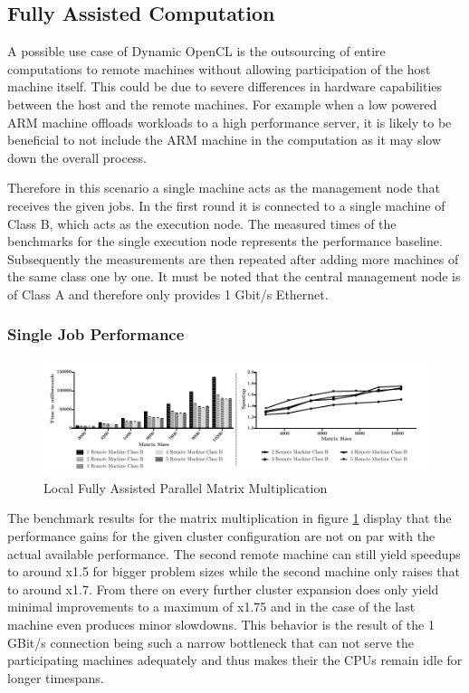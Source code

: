 \subsection{Fully Assisted Computation}
A possible use case of Dynamic OpenCL is the outsourcing of entire computations to remote machines without allowing participation of the host machine itself. This could be due to severe differences in hardware capabilities between the host and the remote machines. For example when a low powered ARM machine offloads workloads to a high performance server, it is likely to be beneficial to not include the ARM machine in the computation as it may slow down the overall process.

Therefore in this scenario a single machine acts as the management node that receives the given jobs. In the first round it is connected to a single machine of Class B, which acts as the execution node. The measured times of the benchmarks for the single execution node represents the performance baseline. Subsequently the measurements are then repeated after adding more machines of the same class one by one. It must be noted that the central management node is of Class A and therefore only provides 1 Gbit/s Ethernet.

\subsubsection*{Single Job Performance}

\begin{figure}[H]
	
	\includegraphics[width=1.0\textwidth]{images/local_fully_assisted_matrix.pdf}
	\centering
	\caption{Local Fully Assisted Parallel Matrix Multiplication}
	\label{img:fully_assisted_parallel_matrix}
\end{figure}

The benchmark results for the matrix multiplication in figure \ref{img:fully_assisted_parallel_matrix} display that the performance gains for the given cluster configuration are not on par with the actual available performance. The second remote machine can still yield speedups to around x1.5 for bigger problem sizes while the second machine only raises that to around x1.7. From there on every further cluster expansion does only yield minimal improvements to a maximum of x1.75 and in the case of the last machine even produces minor slowdowns. This behavior is the result of the 1 GBit/s connection being such a narrow bottleneck that can not serve the participating machines adequately and thus makes their the CPUs remain idle for longer timespans.  

